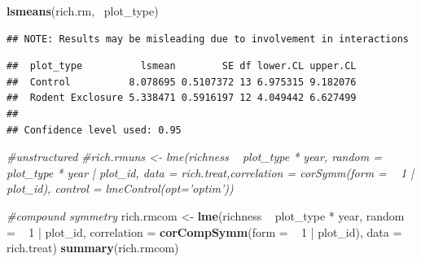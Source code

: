 \documentclass[]{article}
\newenvironment{Shaded}{\begin{snugshade}}{\end{snugshade}}
\newcommand{\KeywordTok}[1]{\textcolor[rgb]{0.13,0.29,0.53}{\textbf{{#1}}}}
\newcommand{\DataTypeTok}[1]{\textcolor[rgb]{0.13,0.29,0.53}{{#1}}}
\newcommand{\DecValTok}[1]{\textcolor[rgb]{0.00,0.00,0.81}{{#1}}}
\newcommand{\StringTok}[1]{\textcolor[rgb]{0.31,0.60,0.02}{{#1}}}
\newcommand{\CommentTok}[1]{\textcolor[rgb]{0.56,0.35,0.01}{\textit{{#1}}}}
\newcommand{\NormalTok}[1]{{#1}}
\begin{document}
\begin{Shaded}
\begin{Highlighting}[]
\KeywordTok{lsmeans}\NormalTok{(rich.rm, ~plot_type)}
\end{Highlighting}
\end{Shaded}

\begin{verbatim}
## NOTE: Results may be misleading due to involvement in interactions
\end{verbatim}

\begin{verbatim}
##  plot_type          lsmean        SE df lower.CL upper.CL
##  Control          8.078695 0.5107372 13 6.975315 9.182076
##  Rodent Exclosure 5.338471 0.5916197 12 4.049442 6.627499
## 
## Confidence level used: 0.95
\end{verbatim}

\begin{Shaded}
\begin{Highlighting}[]
\CommentTok{#unstructured}
\CommentTok{#rich.rmuns <- lme(richness ~ plot_type * year, random = ~ plot_type * year | plot_id, data = rich.treat,correlation = corSymm(form = ~ 1 | plot_id), control = lmeControl(opt='optim'))}


\CommentTok{#compound symmetry}
\NormalTok{rich.rmcom <-}\StringTok{ }\KeywordTok{lme}\NormalTok{(richness ~}\StringTok{ }\NormalTok{plot_type *}\StringTok{ }\NormalTok{year, }\DataTypeTok{random =} \NormalTok{~}\StringTok{ }\DecValTok{1} \NormalTok{|}\StringTok{ }\NormalTok{plot_id,}
               \DataTypeTok{correlation =} \KeywordTok{corCompSymm}\NormalTok{(}\DataTypeTok{form =} \NormalTok{~}\StringTok{ }\DecValTok{1} \NormalTok{|}\StringTok{ }\NormalTok{plot_id),}
               \DataTypeTok{data =} \NormalTok{rich.treat)}
\KeywordTok{summary}\NormalTok{(rich.rmcom)}
\end{Highlighting}
\end{Shaded}
\end{document}
